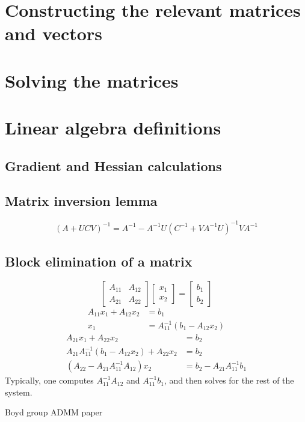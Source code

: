 \documentclass{article}
\begin{document}
\begin{appendix}
\section{Constructing the relevant matrices and vectors}
\section{Solving the matrices}
\section{Linear algebra definitions}
\subsection{Gradient and Hessian calculations}
\subsection{Matrix inversion lemma}\label{inv lemma}
\begin{equation}
(A + UCV)^{-1} = A^{-1} - A^{-1}U (C^{-1} + V A^{-1} U)^{-1} V A^{-1}
\end{equation}
\subsection{Block elimination of a matrix}\label{block elim}
\begin{equation}
\begin{bmatrix} A_{11} & A_{12} \\ A_{21} & A_{22} \end{bmatrix} 
\begin{bmatrix} x_1 \\ x_2 \end{bmatrix} = 
\begin{bmatrix} b_1 \\ b_2 \end{bmatrix}
\end{equation}
\begin{subequations}\begin{align}
A_{11} x_1 + A_{12} x_2 &= b_1 \\
x_1 &= A_{11}^{-1} (b_1 - A_{12} x_2)
\end{align}\end{subequations}
\begin{subequations}\begin{align}
A_{21} x_1 + A_{22} x_2 &= b_2 \\
A_{21} A_{11}^{-1} (b_1 - A_{12} x_2) + A_{22} x_2 &= b_2 \\
(A_{22} - A_{21} A_{11}^{-1} A_{12}) x_2 &= b_2 - A_{21} A_{11}^{-1} b_1
\end{align}\end{subequations}
Typically, one computes $A_{11}^{-1} A_{12}$ and $A_{11}^{-1} b_1$, 
    and then solves for the rest of the system.
\end{appendix}
\begin{thebibliography}{99}
 Boyd group ADMM paper
\end{thebibliography}
\end{document}
